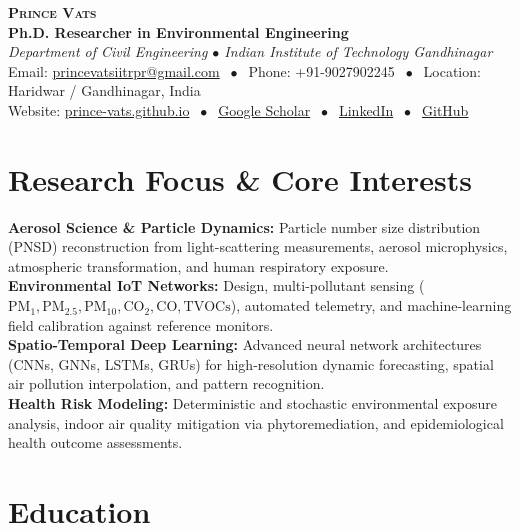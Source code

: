 \documentclass[10pt,a4paper]{article}
\begin{document}
\begin{center}
    {\LARGE \textbf{\textsc{Prince Vats}}}\\[3pt]
    {\large \textbf{Ph.D. Researcher in Environmental Engineering}}\\[2pt]
    {\normalsize \textit{Department of Civil Engineering $\bullet$ Indian Institute of Technology Gandhinagar}}\\[4pt]
    \small
    Email: \href{mailto:princevatsiitrpr@gmail.com}{princevatsiitrpr@gmail.com} $\;\bullet\;$
    Phone: +91-9027902245 $\;\bullet\;$
    Location: Haridwar / Gandhinagar, India\\[2pt]
    Website: \href{https://prince-vats.github.io}{prince-vats.github.io} $\;\bullet\;$
    \href{https://scholar.google.com/citations?user=SPHQZR8AAAAJ&hl=en}{Google Scholar} $\;\bullet\;$
    \href{https://www.linkedin.com/in/prince-vats-iitrpr/}{LinkedIn} $\;\bullet\;$
    \href{https://github.com/prince-vats}{GitHub}
\end{center}

\vspace{2pt}

\section*{Research Focus \& Core Interests}
\textbf{Aerosol Science \& Particle Dynamics:} Particle number size distribution (PNSD) reconstruction from light-scattering measurements, aerosol microphysics, atmospheric transformation, and human respiratory exposure.\\
\textbf{Environmental IoT Networks:} Design, multi-pollutant sensing ($\text{PM}_1, \text{PM}_{2.5}, \text{PM}_{10}, \text{CO}_2, \text{CO}, \text{TVOCs}$), automated telemetry, and machine-learning field calibration against reference monitors.\\
\textbf{Spatio-Temporal Deep Learning:} Advanced neural network architectures (CNNs, GNNs, LSTMs, GRUs) for high-resolution dynamic forecasting, spatial air pollution interpolation, and pattern recognition.\\
\textbf{Health Risk Modeling:} Deterministic and stochastic environmental exposure analysis, indoor air quality mitigation via phytoremediation, and epidemiological health outcome assessments.

\section*{Education}
\end{document}
